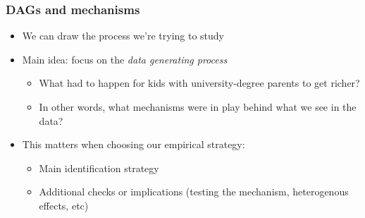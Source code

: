\documentclass[aspectratio=43]{beamer}
\begin{document}
\begin{frame}
\frametitle{DAGs and mechanisms}
\centering

\begin{itemize}[<+->]
\item We can draw the process we're trying to study
\item Main idea: focus on the \textit{data generating process}
  \begin{itemize}
  \item What had to happen for kids with university-degree parents to get richer?
  \item In other words, what mechanisms were in play behind what we see in the data?
  \end{itemize}
\item This matters when choosing our empirical strategy:
  \begin{itemize}
  \item Main identification strategy
  \item Additional checks or implications (testing the mechanism, heterogenous effects, etc)
  \end{itemize}
\end{itemize}

\end{frame}



\end{document}
